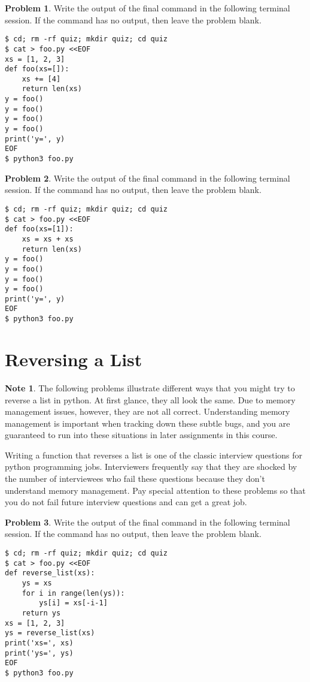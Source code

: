 \documentclass[10pt]{article}
\theoremstyle{definition}
\newtheorem{problem}{Problem}
\newtheorem{note}{Note}
\begin{document}
\filbreak
\begin{problem}
    Write the output of the final command in the following terminal session.
    If the command has no output, then leave the problem blank.
\end{problem}
\begin{lstlisting}
$ cd; rm -rf quiz; mkdir quiz; cd quiz
$ cat > foo.py <<EOF
xs = [1, 2, 3]
def foo(xs=[]):
    xs += [4]
    return len(xs)
y = foo()
y = foo()
y = foo()
y = foo()
print('y=', y)
EOF
$ python3 foo.py
\end{lstlisting}


\filbreak
\begin{problem}
    Write the output of the final command in the following terminal session.
    If the command has no output, then leave the problem blank.
\end{problem}
\begin{lstlisting}
$ cd; rm -rf quiz; mkdir quiz; cd quiz
$ cat > foo.py <<EOF
def foo(xs=[1]):
    xs = xs + xs
    return len(xs)
y = foo()
y = foo()
y = foo()
y = foo()
print('y=', y)
EOF
$ python3 foo.py
\end{lstlisting}


\section{Reversing a List}

\begin{note}
The following problems illustrate different ways that you might try to reverse a list in python.
At first glance, they all look the same.
Due to memory management issues, however, they are not all correct.
Understanding memory management is important when tracking down these subtle bugs,
and you are guaranteed to run into these situations in later assignments in this course.

Writing a function that reverses a list is one of the classic interview questions for python programming jobs.
Interviewers frequently say that they are shocked by the number of interviewees who fail these questions because they don't understand memory management.
Pay special attention to these problems so that you do not fail future interview questions and can get a great job.
\end{note}


\filbreak
\begin{problem}
    Write the output of the final command in the following terminal session.
    If the command has no output, then leave the problem blank.
\end{problem}
\begin{lstlisting}
$ cd; rm -rf quiz; mkdir quiz; cd quiz
$ cat > foo.py <<EOF
def reverse_list(xs):
    ys = xs
    for i in range(len(ys)):
        ys[i] = xs[-i-1]
    return ys
xs = [1, 2, 3]
ys = reverse_list(xs)
print('xs=', xs)
print('ys=', ys)
EOF
$ python3 foo.py
\end{lstlisting}
\end{document}
